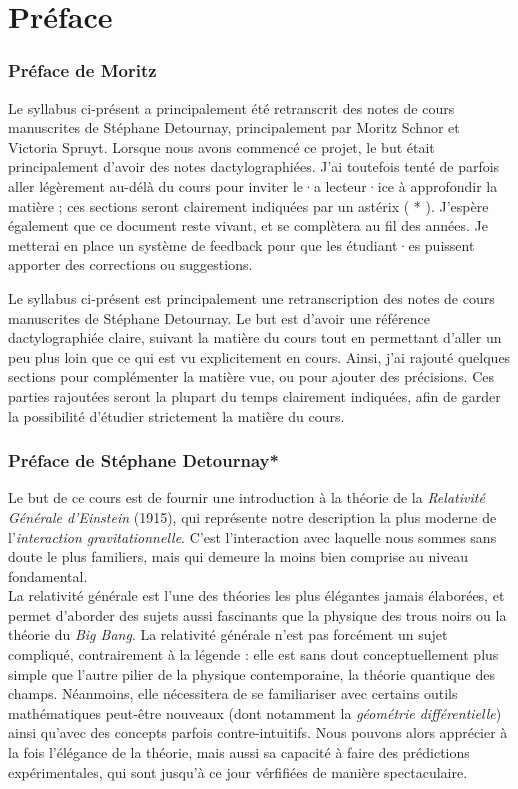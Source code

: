 \section*{Préface}
\subsubsection{Préface de Moritz}
Le syllabus ci-présent a principalement été retranscrit des notes de cours manuscrites de Stéphane Detournay, principalement par Moritz Schnor et Victoria Spruyt. Lorsque nous avons commencé ce projet, le but était principalement d'avoir des notes dactylographiées. J'ai toutefois tenté de parfois aller légèrement au-délà du cours pour inviter le·a lecteur·ice à approfondir la matière ; ces sections seront clairement indiquées par un astérix ( * ). J'espère également que ce document reste vivant, et se complètera au fil des années. Je metterai en place un système de feedback pour que les étudiant·es puissent apporter des corrections ou suggestions. 



Le syllabus ci-présent est principalement une retranscription des notes de cours manuscrites de Stéphane Detournay. Le but est d'avoir une référence dactylographiée claire, suivant la matière du cours tout en permettant d'aller un peu plus loin que ce qui est vu explicitement en cours. Ainsi, j'ai rajouté quelques sections pour complémenter la matière vue, ou pour ajouter des précisions. Ces parties rajoutées seront la plupart du temps clairement indiquées, afin de garder la possibilité d'étudier strictement la matière du cours. 
\cutebreak
\subsubsection{Préface de Stéphane Detournay*}
Le but de ce cours est de fournir une introduction à la théorie de la \emph{Relativité Générale d'Einstein} (1915), qui représente notre description la plus moderne de l'\emph{interaction gravitationnelle}. C'est l'interaction avec laquelle nous sommes sans doute le plus familiers, mais qui demeure la moins bien comprise au niveau fondamental.\\

La relativité générale est l'une des théories les plus élégantes jamais élaborées, et permet d'aborder des sujets aussi fascinants que la physique des trous noirs ou la théorie du \emph{Big Bang}. La relativité générale n'est pas forcément un sujet compliqué, contrairement à la légende : elle est sans dout conceptuellement plus simple que l'autre pilier de la physique contemporaine, la théorie quantique des champs. Néanmoins, elle nécessitera de se familiariser avec certains outils mathématiques peut-être nouveaux (dont notamment la \emph{géométrie différentielle}) ainsi qu'avec des concepts parfois contre-intuitifs. Nous pouvons alors apprécier à la fois l'élégance de la théorie, mais aussi sa capacité à faire des prédictions expérimentales, qui sont jusqu'à ce jour vérfifiées de manière spectaculaire.\\

